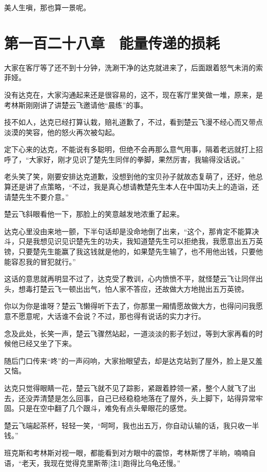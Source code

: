 美人生嗔，那也算一景呢。

\section{第一百二十八章　能量传递的损耗}

大家在客厅等了还不到十分钟，洗涮干净的达克就进来了，后面跟着怒气未消的索菲娅。

没有达克在，大家沟通起来还是很容易的，这不，现在客厅里笑做一堆，原来，是考林斯刚刚讲了讲楚云飞邀请他“晨练”的事。

技不如人，达克已经打算认栽，赔礼道歉了，不过，看到楚云飞漫不经心而又带点淡漠的笑容，他的怒火再次被勾起。

定下心来的达克，不能说有多聪明，但绝不会再那么意气用事，隔着老远就打上招呼了，“大家好，刚才见识了楚先生同伴的拳脚，果然厉害，我输得没话说。”

老头笑了笑，刚要安排达克道歉，没想到他的宝贝孙子就故态复萌了，还好，他总算还是讲了点策略，“不过，我是真心想请教楚先生本人在中国功夫上的造诣，还请楚先生不要介意。”

楚云飞斜眼看他一下，那脸上的笑意越发地浓重了起来。

达克心里没由来地一颤，下半句话却是没命地倒了出来，“这个，那肯定不能算决斗，只是我想见识见识楚先生的功夫，我知道楚先生可以拒绝我，我愿意出五万英镑，只要楚先生能赢了我这钱就是他的，如果楚先生输了，也不用他出钱，只要他能容忍我的冒犯就行。”

这话的意思就再明显不过了，达克受了教训，心内愤愤不平，就怪楚云飞让同伴出头，想毒打楚云飞一顿出出气，怕人家不答应，还故做大方地抛出五万英镑。

你以为你是谁呀？楚云飞懒得听下去了，你那里一厢情愿故做大方，也得问问我愿意不愿意呢，大话谁不会说？不过，那也得有说话的实力才行。

念及此处，长笑一声，楚云飞骤然站起，一道淡淡的影子划过，等到大家再看的时候他已经又坐了下来。

随后门口传来“咚”的一声闷响，大家抬眼望去，却是达克站到了屋外，脸上是又羞又恼。

达克只觉得眼睛一花，楚云飞就不见了踪影，紧跟着脖领一紧，整个人就飞了出去，还没弄清楚是怎么回事，自己已经稳稳地落在了屋外，头上脚下，站得异常牢固。只是在空中翻了几个跟斗，难免有点头晕眼花的感觉。

楚云飞端起茶杯，轻轻一笑，“呵呵，我也出五万，你自动认输的话，我只收一半钱。”

班克斯和考林斯对视一眼，都能看到对方眼中的震惊，考林斯愣了半晌，喃喃自语，“老天，我现在觉得克里斯蒂[注1]跑得比乌龟还慢。”

